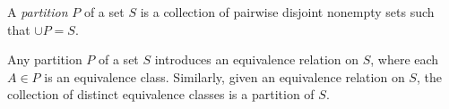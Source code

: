 \documentclass{article}
\begin{document}
A \emph{partition} $P$ of a set $S$ is a collection of pairwise disjoint nonempty sets such that $\cup P = S$.

Any partition $P$ of a set $S$ introduces an equivalence relation on $S$, where each $A \in P$ is an equivalence class.  Similarly, given an equivalence relation on $S$, the collection of distinct equivalence classes is a partition of $S$.
\end{document}

